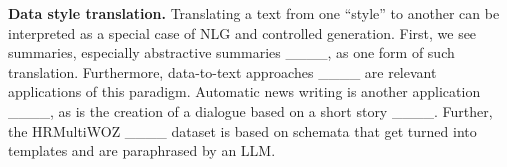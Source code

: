 \textbf{Data style translation.}
Translating a text from one ``style'' to another can be interpreted as a special case of NLG and controlled generation.
First, we see summaries, especially abstractive summaries ____, as one form of such translation.
Furthermore, data-to-text approaches ____ are relevant applications of this paradigm.
Automatic news writing is another application ____, as is 
the creation of a dialogue based on a short story ____.
Further, the HR\-MultiWOZ ____ dataset is based on schemata that get turned into templates and are paraphrased by an LLM\@.


